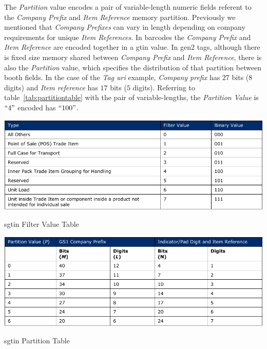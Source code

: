 The \emph{Partition} value encodes a pair of variable-length numeric fields referent to the \emph{Company Prefix} and \emph{Item Reference} memory partition. Previously we mentioned that \emph{Company Prefixes} can vary in length depending on company requirements for unique \emph{Item References}. 
In barcodes the \emph{Company Prefix} and \emph{Item Reference} are encoded together in a \ac{gtin} value. 
In \ac{gen2} tags, although there is fixed size memory shared between \emph{Company Prefix} and \emph{Item Reference}, there is also the \emph{Partition} value, which specifies the distribution of that partition between booth fields.
In the case of the \emph{Tag \ac{uri}} example, \emph{Company prefix} has $27$ bits ($8$ digits) and \emph{Item reference} has $17$ bits ($5$ digits). Referring to table~\ref{tab:partitiontable} with the pair of variable-lengths, the \emph{Partition Value} is $``4"$ encoded has $``100"$.

\begin{table}[]
    \centering
    \includegraphics[width=\textwidth]{./figs/02-state-of-the-art/table_sgtin_filtervalues.pdf}
    \caption[\ac{sgtin} Filter Value Table]{\ac{sgtin} Filter Value Table~\cite{EPCTagData}} 
    \label{tab:sgtinfiltervalues}
\end{table}

\begin{table}[]
    \centering
    \includegraphics[width=\textwidth]{./figs/02-state-of-the-art/table_partitionvalues.pdf}
    \caption[\ac{sgtin} Partition Table]{\ac{sgtin} Partition Table~\cite{EPCTagData}} 
    \label{tab:partitiontable}
\end{table}


